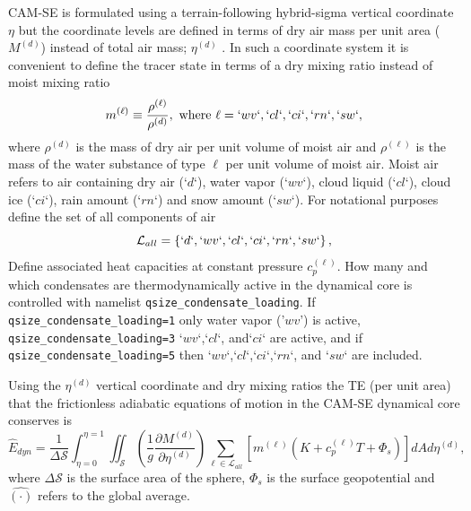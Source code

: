 \documentclass[draft,linenumbers]{agujournal}
\newcommand*{\gi}[1]{\widehat{#1}}
\begin{document}
CAM-SE is formulated using a terrain-following hybrid-sigma vertical coordinate $\eta$ but the coordinate levels are defined in terms of dry air mass per unit area ($M^{(d)}$) instead of total air mass; $\eta^{(d)}$ \citep[see ][ for details]{LetAl2018JAMES}. In such a coordinate system it is convenient to define the tracer state in terms of a dry mixing ratio instead of moist mixing ratio
\begin{equation}
m^{(\ell)}\equiv \frac{\rho^{(\ell)}}{\rho^{(d)}}, \text{ where }\ell=`wv`,`cl`,`ci`,`rn`,`sw`,\label{eq:mx}
\end{equation}
where $\rho^{(d)}$ is the mass of dry air per unit volume of moist air and $\rho^{(\ell)}$ is the mass of the water substance of type $\ell$ per unit volume of moist air. Moist air refers to air containing dry air (`$d$`), water vapor (`$wv$`), cloud liquid (`$cl$`), cloud ice (`$ci$`), rain amount (`$rn$`) and snow amount (`$sw$`). For notational purposes define the set of all components of air
\begin{equation}
\mathcal{L}_{all}=\left\{ `d`,`wv`,`cl`,`ci`,`rn`,`sw`\right\},
\end{equation}
Define associated heat capacities at constant pressure $c_p^{(\ell)}$. {}  How many and which condensates are thermodynamically{\color{red}{/inertially}} active in the dynamical core is controlled with namelist {\tt{qsize\_condensate\_loading}}. If {\tt{qsize\_condensate\_loading=1}} only water vapor ('$wv$') is active, {\tt{qsize\_condensate\_loading=3}} `$wv$`,`$cl$`, and`$ci$` are active, and if {\tt{qsize\_condensate\_loading=5}} then `$wv$`,`$cl$`,`$ci$`,`$rn$`, and `$sw$` are included.

Using the $\eta^{(d)}$ vertical coordinate and dry mixing ratios the TE (per unit area) that the frictionless adiabatic equations of motion in the CAM-SE dynamical core conserves is
\begin{equation}
\gi{E}_{dyn}=\frac{1}{\Delta \mathcal{S}}\int_{\eta=0}^{\eta=1} \iint_\mathcal{S} \left( \frac{1}{g}\frac{\partial M^{(d)}}{\partial \eta^{(d)}} \right)\sum_{\ell \in \mathcal{L}_{all}} \left[m^{(\ell)} \left(K+c_p^{(\ell)}T+\Phi_s  \right)\right]  dA d \eta^{(d)},\label{eq:comprehensice_energy}
\end{equation}
where $\Delta \mathcal{S}$ is the surface area of the sphere, $\Phi_s$ is the surface geopotential and $\gi{(\cdot)}$ refers to the global average.
\end{document}
